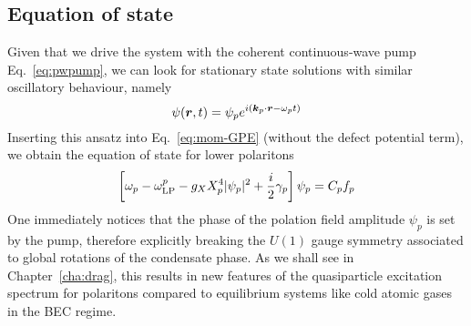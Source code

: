 \subsection{Equation of state}
\label{subsec:eq-state}

Given that we drive the system with the coherent continuous-wave pump Eq.~\eqref{eq:pwpump}, we can look for stationary state solutions with similar oscillatory behaviour, namely
%
\begin{equation}\label{eq:pump-ansatz}
  \psi(\bm{r},t) = \psi_p e^{i (\bm{k}_p \cdot \bm{r}- \omega_p t)}
\end{equation}
% 
Inserting this ansatz into Eq.~\eqref{eq:mom-GPE} (without the defect
potential term), we obtain the equation of state for lower polaritons
%
\begin{equation}\label{eq:pump-mf}
  \left[ \omega_p - \omega^p_{\text{LP}} - g_X X_p^4 \vert \psi_p \vert^2 + \frac{i}{2}\gamma_p\right]\psi_p = C_p f_p
\end{equation}
% 
One immediately notices that the phase of the polation field amplitude
$\psi_p$ is set by the pump, therefore explicitly breaking the $U(1)$
gauge symmetry associated to global rotations of the condensate
phase. As we shall see in Chapter~\ref{cha:drag}, this results in new
features of the quasiparticle excitation spectrum for polaritons
compared to equilibrium systems like cold atomic gases in the BEC
regime. 

